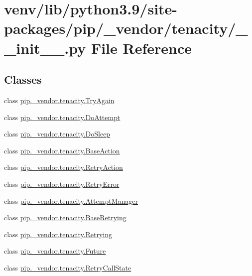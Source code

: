 \hypertarget{venv_2lib_2python3_89_2site-packages_2pip_2__vendor_2tenacity_2____init_____8py}{}\section{venv/lib/python3.9/site-\/packages/pip/\+\_\+vendor/tenacity/\+\_\+\+\_\+init\+\_\+\+\_\+.py File Reference}
\label{venv_2lib_2python3_89_2site-packages_2pip_2__vendor_2tenacity_2____init_____8py}
\subsection*{Classes}
\begin{DoxyCompactItemize}
\item 
class \hyperlink{classpip_1_1__vendor_1_1tenacity_1_1TryAgain}{pip.\+\_\+vendor.\+tenacity.\+Try\+Again}
\item 
class \hyperlink{classpip_1_1__vendor_1_1tenacity_1_1DoAttempt}{pip.\+\_\+vendor.\+tenacity.\+Do\+Attempt}
\item 
class \hyperlink{classpip_1_1__vendor_1_1tenacity_1_1DoSleep}{pip.\+\_\+vendor.\+tenacity.\+Do\+Sleep}
\item 
class \hyperlink{classpip_1_1__vendor_1_1tenacity_1_1BaseAction}{pip.\+\_\+vendor.\+tenacity.\+Base\+Action}
\item 
class \hyperlink{classpip_1_1__vendor_1_1tenacity_1_1RetryAction}{pip.\+\_\+vendor.\+tenacity.\+Retry\+Action}
\item 
class \hyperlink{classpip_1_1__vendor_1_1tenacity_1_1RetryError}{pip.\+\_\+vendor.\+tenacity.\+Retry\+Error}
\item 
class \hyperlink{classpip_1_1__vendor_1_1tenacity_1_1AttemptManager}{pip.\+\_\+vendor.\+tenacity.\+Attempt\+Manager}
\item 
class \hyperlink{classpip_1_1__vendor_1_1tenacity_1_1BaseRetrying}{pip.\+\_\+vendor.\+tenacity.\+Base\+Retrying}
\item 
class \hyperlink{classpip_1_1__vendor_1_1tenacity_1_1Retrying}{pip.\+\_\+vendor.\+tenacity.\+Retrying}
\item 
class \hyperlink{classpip_1_1__vendor_1_1tenacity_1_1Future}{pip.\+\_\+vendor.\+tenacity.\+Future}
\item 
class \hyperlink{classpip_1_1__vendor_1_1tenacity_1_1RetryCallState}{pip.\+\_\+vendor.\+tenacity.\+Retry\+Call\+State}
\end{DoxyCompactItemize}
